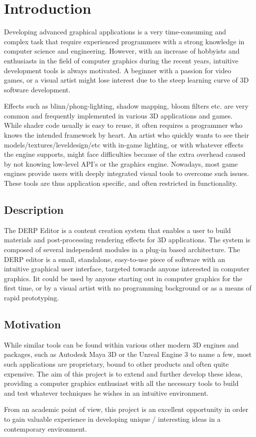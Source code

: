 \chapter{Introduction}

Developing advanced graphical applications is a very time-consuming and complex task that require experienced programmers with a strong knowledge in computer science and engineering. However, with an increase of hobbyists and enthusiasts in the field of computer graphics during the recent years, intuitive development tools is always motivated. A beginner with a passion for video games, or a visual artist might lose interest due to the steep learning curve of 3D software development.

Effects such as blinn/phong-lighting, shadow mapping, bloom filters etc. are very common and frequently implemented in various 3D applications and games. While shader code usually is easy to reuse, it often requires a programmer who knows the intended framework by heart. An artist who quickly wants to see their models/textures/leveldesign/etc with in-game lighting, or with whatever effects the engine supports, might face difficulties because of the extra overhead caused by not knowing low-level API's or the graphics engine. Nowadays, most game engines provide users with deeply integrated visual tools to overcome such issues. These tools are thus application specific, and often restricted in functionality. 
 
\section{Description}

The DERP Editor is a content creation system that enables a user to build materials and post-processing rendering effects for 3D applications. The system is composed of several independent modules in a plug-in based architecture. The DERP editor is a small, standalone, easy-to-use piece of software with an intuitive graphical user interface, targeted towards anyone interested in computer graphics. Iit could be used by anyone starting out in computer graphics for the first time, or by a visual artist with no programming background or as a means of rapid prototyping. 

\section{Motivation}
While similar tools can be found within various other modern 3D engines and packages, such as Autodesk Maya 3D or the Unreal Engine 3 to name a few, most such applications are proprietary, bound to other products and often quite expensive. The aim of this project is to extend and further develop these ideas, providing a computer graphics enthusiast with all the necessary tools to build and test whatever techniques he wishes in an intuitive environment. 
 
From an academic point of view, this project is an excellent opportunity in order to gain valuable experience in developing unique / interesting ideas in a contemporary environment. 
 